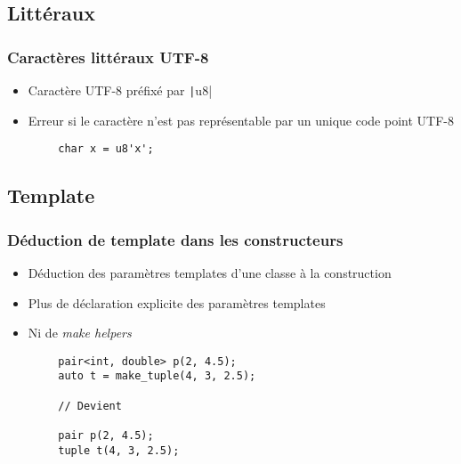 \documentclass[C++.tex]{subfiles}
\begin{document}
\subsection*{Littéraux}
\begin{frame}[fragile]
	\frametitle{Caractères littéraux UTF-8}
	\begin{itemize}
		\item Caractère UTF-8 préfixé par \texttt|u8|
		\item Erreur si le caractère n'est pas représentable par un unique code point UTF-8
	\end{itemize}

	\begin{verbatim}
		char x = u8'x';
	\end{verbatim}

\end{frame}

\subsection*{Template}
\begin{frame}[fragile]
	\frametitle{Déduction de template dans les constructeurs}
	\begin{itemize}
		\item Déduction des paramètres templates d'une classe à la construction
		\item Plus de déclaration explicite des paramètres templates
		\item Ni de \textit{make helpers}
	\end{itemize}


	\begin{verbatim}
		pair<int, double> p(2, 4.5);
		auto t = make_tuple(4, 3, 2.5);

		// Devient

		pair p(2, 4.5);
		tuple t(4, 3, 2.5);
	\end{verbatim}


\end{frame}
\end{document}
